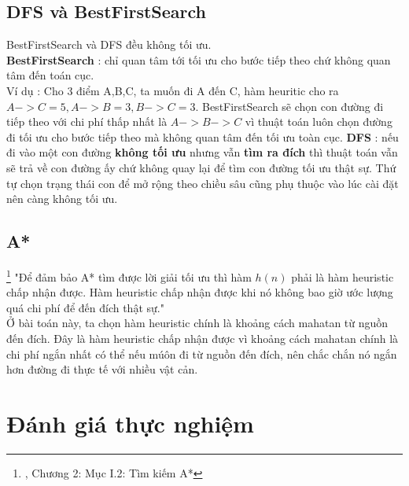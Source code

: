 \documentclass[11pt]{article} %
\begin{document}
\subsection{DFS và BestFirstSearch}
BestFirstSearch và DFS đều không tối ưu.\\
\textbf{BestFirstSearch} : chỉ quan tâm tới tối ưu cho bước tiếp theo chứ không quan tâm đến toán cục.\\
Ví dụ : Cho 3 điểm A,B,C, ta muốn đi A đến C, hàm heuritic cho ra $A->C = 5, A->B = 3, B->C = 3$. BestFirstSearch sẽ chọn con đường đi tiếp theo với chi phí thấp nhất là $A->B->C$ vì thuật toán luôn chọn đường đi tối ưu cho bước tiếp theo mà không quan tâm đến tối ưu toàn cục.
\textbf{DFS} : nếu đi vào một con đường \textbf{không tối ưu} nhưng vẫn \textbf{tìm ra đích} thì thuật toán vẫn sẽ trả về con đường ấy chứ không quay lại để tìm con đường tối ưu thật sự. Thứ tự chọn trạng thái con để mở rộng theo chiều sâu cũng phụ thuộc vào lúc cài đặt nên càng không tối ưu.\\
\subsection{A*}
\footnote{\cite{csttnt_lhb}, Chương 2: Mục I.2: Tìm kiếm A*} "Để đảm bảo A* tìm được lời giải tối ưu thì hàm $h(n)$ phải là hàm heuristic chấp nhận được. Hàm heuristic chấp nhận được khi nó không bao giờ ước lượng quá chi phí để đến đích thật sự."\\
Ở bài toán này, ta chọn hàm heuristic chính là khoảng cách mahatan từ nguồn đến đích. Đây là hàm heuristic chấp nhận được vì khoảng cách mahatan chính là chi phí ngắn nhất có thể nếu múôn đi từ nguồn đến đích, nên chắc chắn nó ngắn hơn đường đi thực tế với nhiều vật cản.\\

\newpage
\section{Đánh giá thực nghiệm}
\end{document}
